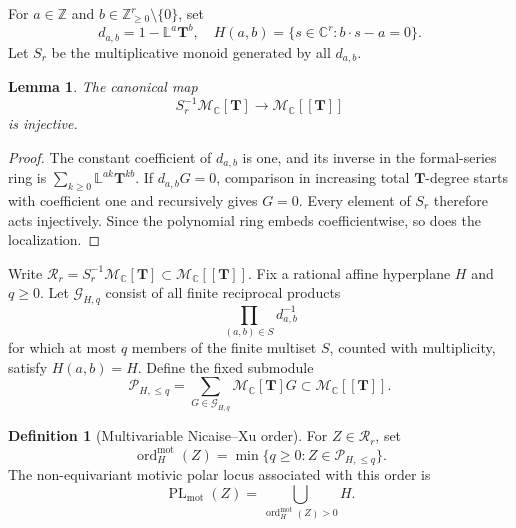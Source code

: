 \documentclass[12pt]{amsart}
\numberwithin{equation}{section}
\theoremstyle{plain}
\newtheorem{lemma}[theorem]{Lemma}
\theoremstyle{definition}
\newtheorem{definition}[theorem]{Definition}
\theoremstyle{remark}
\theoremstyle{definition}
\DeclareMathOperator{\PL}{PL}
\DeclareMathOperator{\ord}{ord}
\newcommand{\C}{\mathbb C}
\newcommand{\Z}{\mathbb Z}
\newcommand{\Lef}{\mathbb L}
\newcommand{\Mmot}{\mathcal M_{\mathbb C}}
\begin{document}
For $a\in\Z$ and $b\in\Z_{\geq0}^r\setminus\{0\}$, set
\begin{equation*}
d_{a,b}=1-\Lef^a\mathbf T^b,
 \quad H(a,b)=\{s\in\C^r:b\cdot s-a=0\}.
\end{equation*}
Let $S_r$ be the multiplicative monoid generated by all $d_{a,b}$.

\begin{lemma}\label{lem:motivic-formal-embedding}
The canonical map
\begin{equation*}
S_r^{-1}\Mmot[\mathbf T]\to \Mmot[\![\mathbf T]\!]
\end{equation*}
is injective.
\end{lemma}

\begin{proof}
The constant coefficient of $d_{a,b}$ is one, and its inverse in the formal-series ring is $\sum_{k\geq0}\Lef^{ak}\mathbf T^{kb}$. If $d_{a,b}G=0$, comparison in increasing total $\mathbf T$-degree starts with coefficient one and recursively gives $G=0$. Every element of $S_r$ therefore acts injectively. Since the polynomial ring embeds coefficientwise, so does the localization. 
\end{proof}

Write $\mathscr R_r=S_r^{-1}\Mmot[\mathbf T]\subset\Mmot[\![\mathbf T]\!]$. Fix a rational affine hyperplane $H$ and $q\geq0$. Let $\mathcal G_{H,q}$ consist of all finite reciprocal products
\begin{equation*}
\prod_{(a,b)\in S}d_{a,b}^{-1}
\end{equation*}
for which at most $q$ members of the finite multiset $S$, counted with multiplicity, satisfy $H(a,b)=H$. Define the fixed submodule
\begin{equation}\label{eq:motivic-NX-module}
 \mathscr P_{H,\le q}=\sum_{G\in\mathcal G_{H,q}}\Mmot[\mathbf T]G\subset\Mmot[\![\mathbf T]\!].
\end{equation}

\begin{definition}[Multivariable Nicaise--Xu order]\label{def:motivic-NX-order}
For $Z\in\mathscr R_r$, set
\begin{equation*}
\ord_H^{\mathrm{mot}}(Z)=\min\{q\geq0:Z\in\mathscr P_{H,\le q}\}.
\end{equation*}
The non-equivariant motivic polar locus associated with this order is
\begin{equation*}
\PL_{\mathrm{mot}}(Z)=\bigcup_{\ord_H^{\mathrm{mot}}(Z)>0}H.
\end{equation*}
\end{definition}
\end{document}
